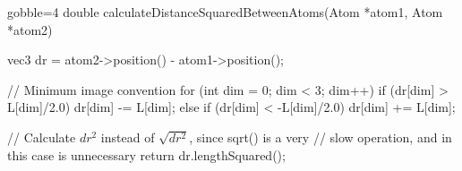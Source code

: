 \begin{listing}[!htb]%
\begin{cppcode*}{gobble=4}
    double calculateDistanceSquaredBetweenAtoms(Atom *atom1, Atom *atom2)
    {
        vec3 dr = atom2->position() - atom1->position();
        
        // Minimum image convention
        for (int dim = 0; dim < 3; dim++)
        {
            if      (dr[dim] >  L[dim]/2.0) dr[dim] -= L[dim];
            else if (dr[dim] < -L[dim]/2.0) dr[dim] += L[dim];
        }
        
        // Calculate $dr^2$ instead of $\sqrt{dr^2}$, since sqrt() is a very 
        // slow operation, and in this case is unnecessary
        return dr.lengthSquared();
    }
\end{cppcode*}
\caption{%
    \texttt{calculateDistanceSquaredBetweenAtoms}%
    \label{list:calculateDistanceSquaredBetweenAtoms}%
}%
\end{listing}%


